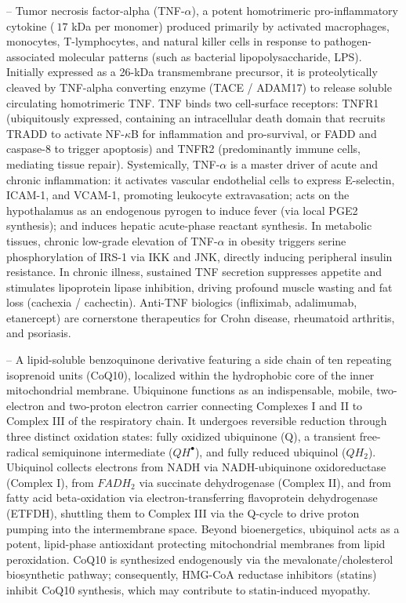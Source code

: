 -- Tumor necrosis factor-alpha (TNF-$\alpha$), a potent homotrimeric pro-inflammatory cytokine ($~17$ kDa per monomer) produced primarily by activated macrophages, monocytes, T-lymphocytes, and natural killer cells in response to pathogen-associated molecular patterns (such as bacterial lipopolysaccharide, LPS). Initially expressed as a 26-kDa transmembrane precursor, it is proteolytically cleaved by TNF-alpha converting enzyme (TACE / ADAM17) to release soluble circulating homotrimeric TNF. TNF binds two cell-surface receptors: TNFR1 (ubiquitously expressed, containing an intracellular death domain that recruits TRADD to activate NF-$\kappa$B for inflammation and pro-survival, or FADD and caspase-8 to trigger apoptosis) and TNFR2 (predominantly immune cells, mediating tissue repair). Systemically, TNF-$\alpha$ is a master driver of acute and chronic inflammation: it activates vascular endothelial cells to express E-selectin, ICAM-1, and VCAM-1, promoting leukocyte extravasation; acts on the hypothalamus as an endogenous pyrogen to induce fever (via local PGE2 synthesis); and induces hepatic acute-phase reactant synthesis. In metabolic tissues, chronic low-grade elevation of TNF-$\alpha$ in obesity triggers serine phosphorylation of IRS-1 via IKK and JNK, directly inducing peripheral insulin resistance. In chronic illness, sustained TNF secretion suppresses appetite and stimulates lipoprotein lipase inhibition, driving profound muscle wasting and fat loss (cachexia / cachectin). Anti-TNF biologics (infliximab, adalimumab, etanercept) are cornerstone therapeutics for Crohn disease, rheumatoid arthritis, and psoriasis.

-- A lipid-soluble benzoquinone derivative featuring a side chain of ten repeating isoprenoid units (CoQ10), localized within the hydrophobic core of the inner mitochondrial membrane. Ubiquinone functions as an indispensable, mobile, two-electron and two-proton electron carrier connecting Complexes I and II to Complex III of the respiratory chain. It undergoes reversible reduction through three distinct oxidation states: fully oxidized ubiquinone (Q), a transient free-radical semiquinone intermediate ($QH^\bullet$), and fully reduced ubiquinol ($QH_2$). Ubiquinol collects electrons from NADH via NADH-ubiquinone oxidoreductase (Complex I), from $FADH_2$ via succinate dehydrogenase (Complex II), and from fatty acid beta-oxidation via electron-transferring flavoprotein dehydrogenase (ETFDH), shuttling them to Complex III via the Q-cycle to drive proton pumping into the intermembrane space. Beyond bioenergetics, ubiquinol acts as a potent, lipid-phase antioxidant protecting mitochondrial membranes from lipid peroxidation. CoQ10 is synthesized endogenously via the mevalonate/cholesterol biosynthetic pathway; consequently, HMG-CoA reductase inhibitors (statins) inhibit CoQ10 synthesis, which may contribute to statin-induced myopathy.

